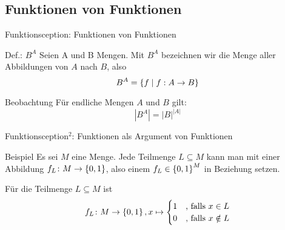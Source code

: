 \subsection{Funktionen von Funktionen}

\begin{frame}{Funktionsception: Funktionen von Funktionen}
	\begin{block}{Def.: $B^A$}
		Seien A und B Mengen. Mit $B^A$ bezeichnen wir die Menge aller Abbildungen von $A$ nach $B$, also $$B^A = \left\{ f \mid f : A \to B  \right\}$$
	\end{block}

	\begin{block}{Beobachtung}
		Für endliche Mengen $A$ und $B$ gilt:
		$$|B^A| = |B|^{|A|}$$
	\end{block}
\end{frame}

\begin{frame}{Funktionsception${}^2$: Funktionen als Argument von Funktionen}

	\begin{exampleblock}{Beispiel}
		\small Es sei $M$ eine Menge. Jede Teilmenge $L \subseteq M$ kann man mit einer Abbildung $f_L \colon M \to \left\{ 0,1 \right\}$, also einem $f_L \in \left\{ 0,1 \right\}^M$ in Beziehung setzen.

		Für die Teilmenge $L \subseteq M$ ist 
		\begin{equation*} 
			f_L \colon M \to \left\{ 0,1 \right\}, x \mapsto
			\begin{cases}
				1 & \text{, falls } x \in L \\
				0 & \text{, falls } x \notin L
			\end{cases}
		\end{equation*}
	\end{exampleblock}
\end{frame}

